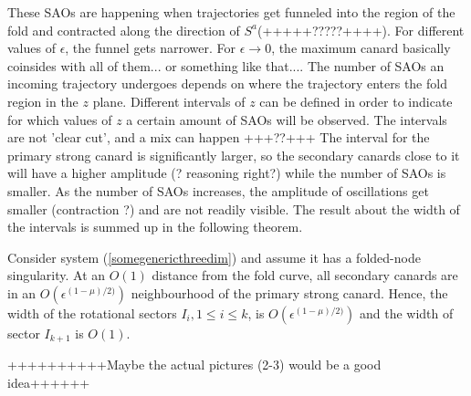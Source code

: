 These SAOs are happening when trajectories get funneled into the region of the fold and contracted along the direction of $S^a$(+++++?????++++). For different values of $\epsilon$, the funnel gets narrower. For $\epsilon \to 0$, the maximum canard basically coinsides with all of them... or something like that....
The number of SAOs an incoming trajectory undergoes depends on where the trajectory enters the fold region in the $z$ plane. Different intervals of $z$ can be defined in order to indicate for which values of $z$ a certain amount of SAOs will be observed. The intervals are not 'clear cut', and a mix can happen +++??+++
The interval for the primary strong canard is significantly larger, so the secondary canards close to it will have a higher amplitude (? reasoning right?) while the number of SAOs is smaller. As the number of SAOs increases, the amplitude of oscillations get smaller (contraction ?) and are not readily visible.
The result about the width of the intervals is summed up in the following theorem.

\begin{theorem}
Consider system (\ref{somegenericthreedim}) and assume it has a folded-node singularity. At an $O(1)$ distance from the fold curve, all secondary canards are in an $O(\epsilon^{(1- \mu)/2)})$ neighbourhood of the primary strong canard. Hence, the width of the  rotational sectors $I_i, 1 \leq i \leq k$, is $O(\epsilon^{(1- \mu)/2)})$ and the width of sector $I_{k+1}$ is $O(1)$.
\end{theorem}

++++++++++Maybe the actual pictures (2-3) would be a good idea++++++ 


